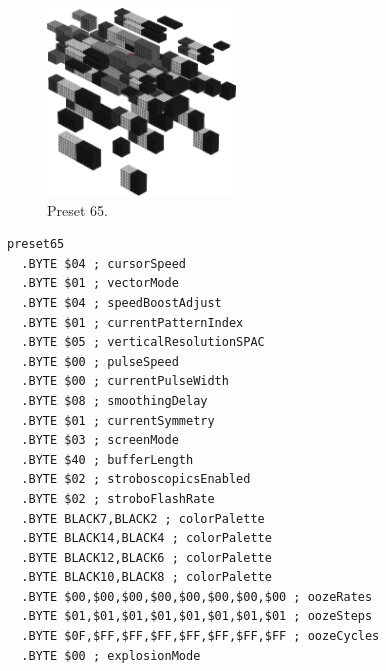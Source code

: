 \vspace*{0.5cm}
\begin{minipage}[b]{0.48\linewidth}
\begin{figure}[H]                                                          
  \centering                                                             
  \begin{adjustbox}{width=5cm,center}                                   
  \includegraphics[width=5cm]{src/colorspace_presets/preset65-45.png}%
  \end{adjustbox}                                                        
\caption*{Preset 65.}                                           
\end{figure}                                                               
\end{minipage}
\hspace{0.1cm}
\begin{minipage}[b]{0.48\linewidth}                                                                         
\begin{lstlisting}[basicstyle=\ttfamily\tiny]
preset65
  .BYTE $04 ; cursorSpeed
  .BYTE $01 ; vectorMode
  .BYTE $04 ; speedBoostAdjust
  .BYTE $01 ; currentPatternIndex
  .BYTE $05 ; verticalResolutionSPAC
  .BYTE $00 ; pulseSpeed
  .BYTE $00 ; currentPulseWidth
  .BYTE $08 ; smoothingDelay
  .BYTE $01 ; currentSymmetry
  .BYTE $03 ; screenMode
  .BYTE $40 ; bufferLength
  .BYTE $02 ; stroboscopicsEnabled
  .BYTE $02 ; stroboFlashRate
  .BYTE BLACK7,BLACK2 ; colorPalette
  .BYTE BLACK14,BLACK4 ; colorPalette
  .BYTE BLACK12,BLACK6 ; colorPalette
  .BYTE BLACK10,BLACK8 ; colorPalette
  .BYTE $00,$00,$00,$00,$00,$00,$00,$00 ; oozeRates
  .BYTE $01,$01,$01,$01,$01,$01,$01,$01 ; oozeSteps
  .BYTE $0F,$FF,$FF,$FF,$FF,$FF,$FF,$FF ; oozeCycles
  .BYTE $00 ; explosionMode
\end{lstlisting}
\end{minipage}


